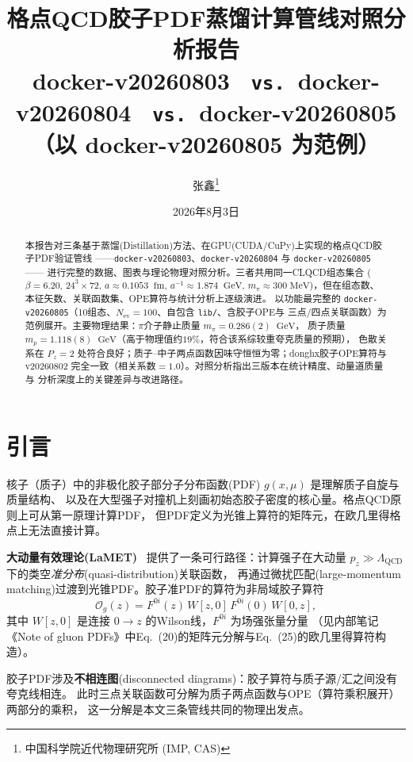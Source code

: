 \documentclass[11pt,a4paper]{article}
\title{\textbf{格点QCD胶子PDF蒸馏计算管线对照分析报告}\\[0.4em]
       \large docker-v20260803 \ \texttt{vs.}\ docker-v20260804 \ \texttt{vs.}\ docker-v20260805\\[0.3em]
       （以 docker-v20260805 为范例）}
\author{张鑫\thanks{中国科学院近代物理研究所 (IMP, CAS)}}
\date{2026年8月3日}
\newcommand{\gev}{\;\mathrm{GeV}}
\newcommand{\fm}{\;\mathrm{fm}}
\newcommand{\Nev}{N_{\mathrm{ev}}}
\newcommand{\apm}{a^{-1}}
\begin{document}
\maketitle

\begin{abstract}
本报告对三条基于蒸馏(Distillation)方法、在GPU(CUDA/CuPy)上实现的格点QCD胶子PDF验证管线
——\texttt{docker-v20260803}、\texttt{docker-v20260804} 与 \texttt{docker-v20260805}——
进行完整的数据、图表与理论物理对照分析。三者共用同一CLQCD组态集合
($\beta=6.20$, $24^3\times72$, $a\approx0.1053\;\fm$, $\apm\approx1.874\;\gev$,
$m_\pi\approx300\;\mathrm{MeV}$)，但在组态数、本征矢数、关联函数集、OPE算符与统计分析上逐级演进。
以功能最完整的 \texttt{docker-v20260805}（10组态、$\Nev=100$、自包含 \texttt{lib/}、含胶子OPE与
三点/四点关联函数）为范例展开。主要物理结果：$\pi$介子静止质量 $m_\pi=0.286(2)\;\gev$，
质子质量 $m_p=1.118(8)\;\gev$（高于物理值约$19\%$，符合该系综较重夸克质量的预期），
色散关系在 $P_z=2$ 处符合良好；质子--中子两点函数因味守恒恒为零；donghx胶子OPE算符与
v20260802 完全一致（相关系数$=1.0$）。对照分析指出三版本在统计精度、动量道质量与
分析深度上的关键差异与改进路径。
\end{abstract}

\tableofcontents
\newpage

\section{引言}
核子（质子）中的非极化胶子部分子分布函数(PDF) $g(x,\mu)$ 是理解质子自旋与质量结构、
以及在大型强子对撞机上刻画初始态胶子密度的核心量。格点QCD原则上可从第一原理计算PDF，
但PDF定义为光锥上算符的矩阵元，在欧几里得格点上无法直接计算。

\textbf{大动量有效理论(LaMET)}~\cite{ji2013,ji2021} 提供了一条可行路径：计算强子在大动量
$p_z\gg \Lambda_{\mathrm{QCD}}$ 下的类空\emph{准分布}(quasi-distribution)关联函数，
再通过微扰匹配(large-momentum matching)过渡到光锥PDF。胶子准PDF的算符为非局域胶子算符
\begin{equation}
\mathcal{O}_g(z) = F^{0i}(z)\,W[z,0]\,F^{0i}(0)\,W[0,z],
\label{eq:gluon-operator}
\end{equation}
其中 $W[z,0]$ 是连接 $0\to z$ 的Wilson线，$F^{0i}$ 为场强张量分量
（见内部笔记《Note of gluon PDFs》中Eq.~(20)的矩阵元分解与Eq.~(25)的欧几里得算符构造）。

胶子PDF涉及\textbf{不相连图}(disconnected diagrams)：胶子算符与质子源/汇之间没有夸克线相连。
此时三点关联函数可分解为质子两点函数与OPE（算符乘积展开）两部分的乘积，
这一分解是本文三条管线共同的物理出发点。
\end{document}
